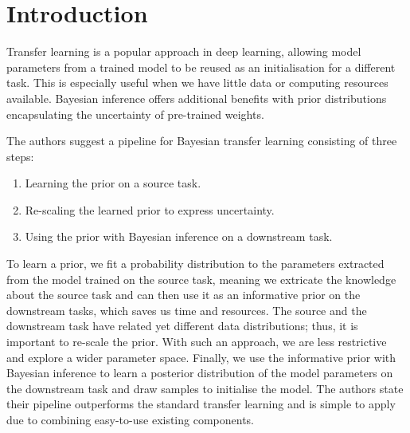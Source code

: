 

\section{Introduction}

Transfer learning is a popular approach in deep learning, allowing model parameters from a trained model to be reused as an initialisation for a different task. This is especially useful when we have little data or computing resources available. Bayesian inference offers additional benefits with prior distributions encapsulating the uncertainty of pre-trained weights.

The authors suggest a pipeline for Bayesian transfer learning consisting of three steps:
\begin{enumerate}
    \item Learning the prior on a source task.
    \item Re-scaling the learned prior to express uncertainty.
    \item Using the prior with Bayesian inference on a downstream task.
\end{enumerate}
To learn a prior, we fit a probability distribution to the parameters extracted from the model trained on the source task, meaning we extricate the knowledge about the source task and can then use it as an informative prior on the downstream tasks, which saves us time and resources. The source and the downstream task have related yet different data distributions; thus, it is important to re-scale the prior. With such an approach, we are less restrictive and explore a wider parameter space. Finally, we use the informative prior with Bayesian inference to learn a posterior distribution of the model parameters on the downstream task and draw samples to initialise the model. The authors state their pipeline outperforms the standard transfer learning and is simple to apply due to combining easy-to-use existing components.

